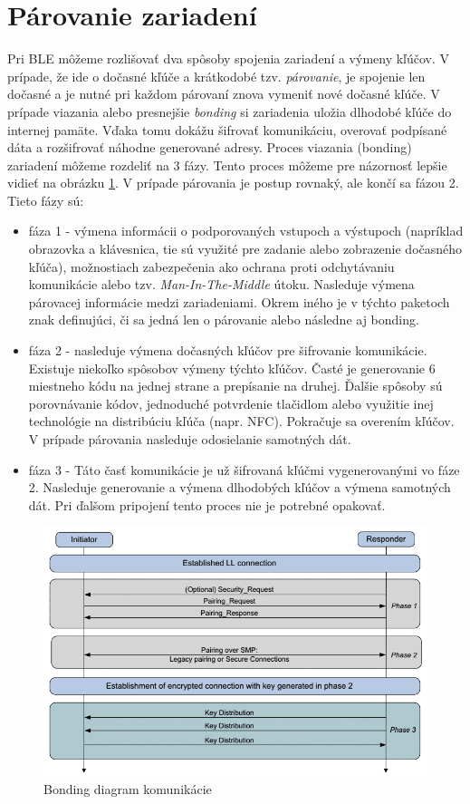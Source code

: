 \section{Párovanie zariadení}

Pri BLE môžeme rozlišovať dva spôsoby spojenia zariadení a výmeny kľúčov. V prípade, že ide o dočasné kľúče a krátkodobé tzv. \textit{párovanie}, je spojenie len dočasné a je nutné pri každom párovaní znova vymeniť nové dočasné kľúče. V prípade viazania alebo presnejšie \textit{bonding} si zariadenia uložia dlhodobé kľúče do internej pamäte. Vďaka tomu dokážu šifrovať komunikáciu, overovať podpísané dáta a rozšifrovať náhodne generované adresy.
Proces viazania (bonding) zariadení môžeme rozdeliť na 3 fázy. Tento proces môžeme pre názornosť lepšie vidieť na obrázku \ref{fig:bonding}. V prípade párovania je postup rovnaký, ale končí sa fázou 2. Tieto fázy sú:
\begin{itemize}
    \item fáza 1 - výmena informácii o podporovaných vstupoch a výstupoch (napríklad obrazovka a klávesnica, tie sú využité pre zadanie alebo zobrazenie dočasného kľúča), možnostiach zabezpečenia ako ochrana proti odchytávaniu komunikácie alebo tzv. \textit{Man-In-The-Middle} útoku. Nasleduje výmena párovacej informácie medzi zariadeniami. Okrem iného je v týchto paketoch znak definujúci, či sa jedná len o párovanie alebo následne aj bonding.
    \item fáza 2 - nasleduje výmena dočasných kľúčov pre šifrovanie komunikácie. Existuje niekoľko spôsobov výmeny týchto kľúčov. Časté je generovanie 6 miestneho kódu na jednej strane a prepísanie na druhej. Ďalšie spôsoby sú porovnávanie kódov, jednoduché potvrdenie tlačidlom alebo využitie inej technológie na distribúciu kľúča (napr. NFC). Pokračuje sa overením kľúčov. V prípade párovania nasleduje odosielanie samotných dát.
    \item fáza 3 - Táto časť komunikácie je už šifrovaná kľúčmi vygenerovanými vo fáze 2. Nasleduje generovanie a výmena dlhodobých kľúčov a výmena samotných dát. Pri ďalšom pripojení tento proces nie je potrebné opakovať.\cite{bluetooth}
\end{itemize}

\begin{figure}[ht]
    \centering
    \includegraphics[width=0.75\linewidth]{obrazky-figures/pairing-flowchart.png}
    \caption[Bonding diagram komunikácie]{Bonding diagram komunikácie\cite{bluetooth}}
    \label{fig:bonding}
\end{figure}



